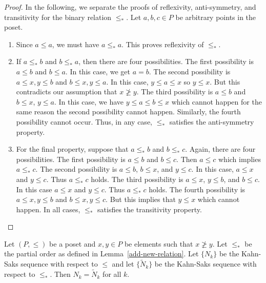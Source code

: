 \documentclass{puthesis-UG}
\begin{document}
\begin{proof}
    In the following, we separate the proofs of reflexivity, anti-symmetry, and transitivity for the binary relation $\leq_*$. Let $a, b, c \in P$ be arbitrary points in the poset. 
    \begin{enumerate}[label = (\roman*)]
        \item Since $a \leq a$, we must have $a \leq_* a$. This proves reflexivity of $\leq_*$.

        \item If $a \leq_* b$ and $b \leq_* a$, then there are four possibilities. The first possibility is $a \leq b$ and $b \leq a$. In this case, we get $a = b$. The second possibility is $a \leq x, y \leq b$ and $b \leq x, y \leq a$. In this case, $y \leq a \leq x$ so $y \leq x$. But this contradicts our assumption that $x \not \geq y$. The third possibility is $a \leq b$ and $b \leq x$, $y \leq a$. In this case, we have $y \leq a \leq b \leq x$ which cannot happen for the same reason the second possibility cannot happen. Similarly, the fourth possibility cannot occur. Thus, in any case, $\leq_*$ satisfies the anti-symmetry property.

        \item For the final property, suppose that $a \leq_* b$ and $b \leq_* c$. Again, there are four possibilities. The first possibility is $a \leq b$ and $b \leq c$. Then $a \leq c$ which implies $a \leq_* c$. The second possibility is $a \leq b$, $b \leq x$, and $y \leq c$. In this case, $a \leq x$ and $y \leq c$. Thus $a \leq_* c$ holds. The third possibility is $a \leq x$, $y \leq b$, and $b \leq c$. In this case $a \leq x$ and $y \leq c$. Thus $a \leq_* c$ holds. The fourth possibility is $a \leq x, y \leq b$ and $b \leq x, y \leq c$. But this implies that $y \leq x$ which cannot happen. In all cases, $\leq_*$ satisfies the transitivity property.  
    \end{enumerate} 
\end{proof}

\begin{lem} \label{doesn't-change}
    Let $(P, \leq)$ be a poset and $x, y \in P$ be elements such that $x \not \geq y$. Let $\leq_*$ be the partial order as defined in Lemma~\ref{add-new-relation}. Let $\{N_k\}$ be the Kahn-Saks sequence with respect to $\leq$ and let $\{\widetilde{N}_k\}$ be the Kahn-Saks sequence with respect to $\leq_*$. Then $N_k = \widetilde{N}_k$ for all $k$. 
\end{lem}
\end{document}
